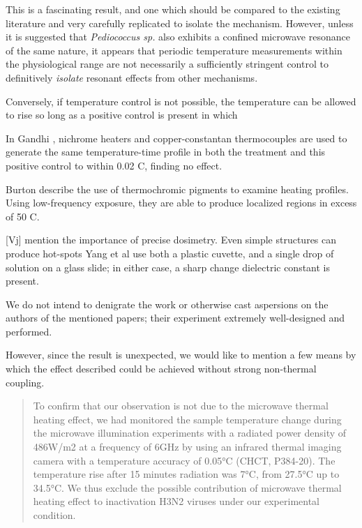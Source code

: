 \documentclass[paper.tex]{subfiles}
\begin{document}
This is a fascinating result, and one which should be compared to the existing literature and very carefully replicated to isolate the mechanism. However, unless it is suggested that {\it Pediococcus sp.} also exhibits a confined microwave resonance of the same nature, it appears that periodic temperature measurements within the physiological range are not necessarily a sufficiently stringent control to definitively {\it isolate} resonant effects from other mechanisms.

Conversely, if temperature control is not possible, the temperature can be allowed to rise so long as a positive control is present in which 

In Gandhi \cite{Basic1983}, nichrome heaters and copper-constantan thermocouples are used to generate the same temperature-time profile in both the treatment and this positive control to within 0.02 C, finding no effect. 

Burton\cite{Effects1950} describe the use of thermochromic pigments to examine heating profiles. Using low-frequency exposure, they are able to produce localized regions in excess of 50 C.






[Vj] mention the importance of precise dosimetry. Even simple structures can produce hot-spots 
Yang et al use both a plastic cuvette, and a single drop of solution on a glass slide; in either case, a sharp change dielectric constant is present.


We do not intend to denigrate the work or otherwise cast aspersions on the authors of the mentioned papers; their experiment extremely well-designed and performed. 

However, since the result is unexpected, we would like to mention a few means by which the effect described could be achieved without strong non-thermal coupling.

\begin{quote}
	
	To confirm that our observation is not due to the microwave thermal heating effect, we had monitored the sample temperature change during the microwave illumination experiments with a radiated power density of 486W/m2 at a frequency of 6GHz by using an infrared thermal imaging camera with a temperature accuracy of 0.05°C (CHCT, P384-20). The temperature rise after 15 minutes radiation was 7°C, from 27.5°C up to 34.5°C. We thus exclude the possible contribution of microwave thermal heating effect to inactivation H3N2 viruses under our experimental condition.
	
\end{quote}
\end{document}
